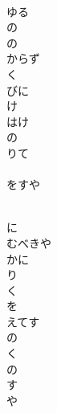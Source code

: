 \documentclass[10pt,b5j]{tarticle} %
\begin{document}
\vspace{1.5em} %
\newcommand{\linespace}{0.5em} %
\newcommand{\blocksize}{0.5\hsize} %
\newcommand{\itemmargin}{6em} %
\begin{enumerate} %
    \setlength{\itemindent}{\itemmargin} %
    \begin{minipage}[c]{\blocksize}
    
        \vspace{\linespace}
        \item~\\
        ゆる\\
        の\\
        の\\
        からず\\
        く\\
        びに\\
        け\\
        はけ\\
        の\\
        りて\\
        \\
        をすや
        
        \vspace{\linespace}
        \item~\\
        に\\
        むべきや\\
        かに\\
        り\\
        く\\
        を\\
        えてす\\
        の\\
        く\\
        の\\
        す\\
        や
        

\end{minipage}
\end{enumerate}
\end{document}

